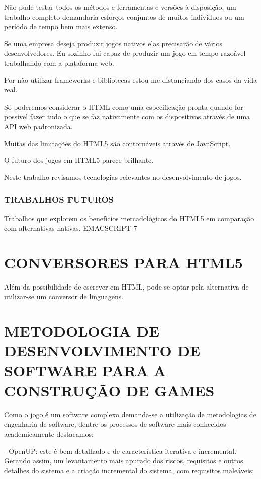 \documentclass[
12pt,
a4paper,
portuges,
draft
]{report}
\begin{document}
Não pude testar todos os métodos e ferramentas e versões à
disposição, um trabalho completo demandaria esforços conjuntos de
muitos indivíduos ou um período de tempo bem mais extenso. 

Se uma empresa deseja produzir jogos nativos elas precisarão de vários
desenvolvedores. Eu sozinho fui capaz de produzir um jogo em tempo
razoável trabalhando com a plataforma web.

Por não utilizar frameworks e bibliotecas estou me distanciando
dos casos da vida real.

Só poderemos considerar o HTML como uma especificação pronta quando for possível fazer tudo o que se faz nativamente com os dispositivos através de uma API web padronizada.

Muitas das limitações do HTML5 são contornáveis através de JavaScript.

O futuro dos jogos em HTML5 parece brilhante.


Neste trabalho revisamos tecnologias relevantes no desenvolvimento de jogos.


\subsection{TRABALHOS FUTUROS}

Trabalhos que explorem os benefícios mercadológicos do HTML5 em comparação com alternativas nativas.
EMACSCRIPT 7


\clearpage
\markboth{}{}
\printbibliography[heading=bibintoc,title={REFERÊNCIAS BIBLIOGRÁFICAS}]
\markboth{}{}
\appendix

\chapter{CONVERSORES PARA HTML5}
Além da possibilidade de escrever em HTML, pode-se optar pela
alternativa de utilizar-se um conversor de linguagens.

\chapter{METODOLOGIA DE DESENVOLVIMENTO DE SOFTWARE PARA A CONSTRUÇÃO DE GAMES}

Como o jogo é um software complexo demanda-se a utilização de
metodologias de engenharia de software, dentre os processos de software
mais conhecidos academicamente destacamos:

- OpenUP: este é bem detalhado e de característica iterativa e
incremental. Gerando assim, um levantamento mais apurado dos riscos,
requisitos e outros detalhes do sistema e a criação incremental do
sistema, com requisitos maleáveis;
\end{document}
